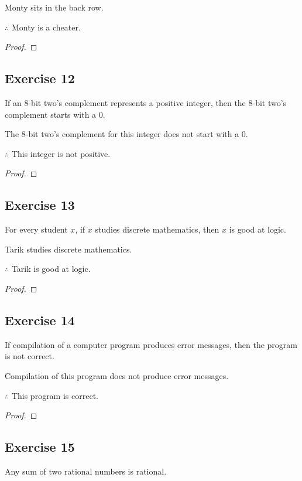 \documentclass[14pt]{extarticle}
\begin{document}
Monty sits in the back row.

$\therefore$ Monty is a cheater.

\begin{proof}

\end{proof}

\subsection{Exercise 12}
If an 8-bit two’s complement represents a positive integer, then the 8-bit two’s complement starts with a 0.

The 8-bit two’s complement for this integer does not start with a 0.

$\therefore$ This integer is not positive.

\begin{proof}

\end{proof}

\subsection{Exercise 13}
For every student $x$, if $x$ studies discrete mathematics, then $x$ is good at logic.

Tarik studies discrete mathematics.

$\therefore$ Tarik is good at logic.

\begin{proof}

\end{proof}

\subsection{Exercise 14}
If compilation of a computer program produces error messages, then the program is not correct.

Compilation of this program does not produce error messages.

$\therefore$ This program is correct.

\begin{proof}

\end{proof}

\subsection{Exercise 15}
Any sum of two rational numbers is rational.
\end{document}
